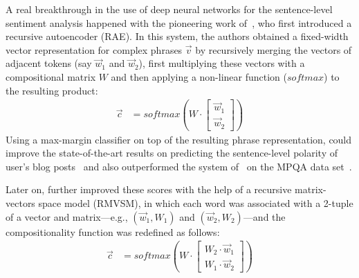 
\citet{Yessenalina:11}

A real breakthrough in the use of deep neural networks for the
sentence-level sentiment analysis happened with the pioneering work
of~\citet{Socher:11}, who first introduced a recursive autoencoder
(RAE).  In this system, the authors obtained a fixed-width vector
representation for complex phrases $\vec{v}$ by recursively merging
the vectors of adjacent tokens (say $\vec{w}_1$ and $\vec{w}_2$),
first multiplying these vectors with a compositional matrix $W$ and
then applying a non-linear function ($softmax$) to the resulting
product:
\begin{align*}
  \vec{c} &= softmax\left(W\cdot\begin{bmatrix}
  \vec{w}_1\\
  \vec{w}_2
  \end{bmatrix}\right)
\end{align*}
Using a max-margin classifier on top of the resulting phrase
representation, \citet{Socher:11} could improve the state-of-the-art
results on predicting the sentence-level polarity of user's blog
posts~\cite{Potts:10} and also outperformed the system
of~\citet{Nasukawa:03} on the MPQA data set~\cite{Wiebe:05}.

Later on, \citet{Socher:12} further improved these scores with the
help of a recursive matrix-vectors space model (RMVSM), in which each
word was associated with a 2-tuple of a vector and matrix---e.g.,
$(\vec{w}_1, W_1)$ and $(\vec{w}_2, W_2)$---and the compositionality
function was redefined as follows:
\begin{align*}
  \vec{c} &= softmax\left(W\cdot\begin{bmatrix}
  W_2\cdot\vec{w}_1\\
  W_1\cdot\vec{w}_2
  \end{bmatrix}\right)
\end{align*}

\citet{Wang:15}


\todo[inline]{}

